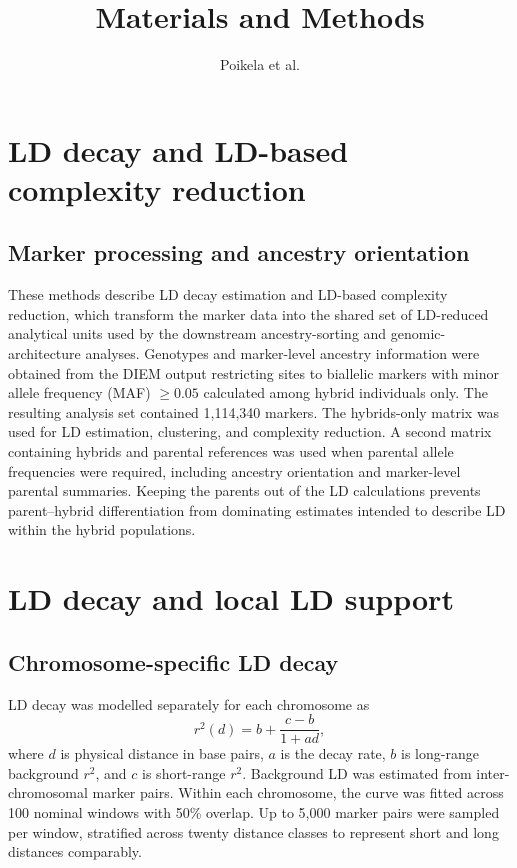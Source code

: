 \documentclass[11pt]{article}
\title{\vspace{-3em}
  \textbf{\color{Accent}Materials and Methods}\\[0.3em]}
\author{Poikela et al.}
\begin{document}
\maketitle
\section*{LD decay and LD-based complexity reduction}

\subsection*{Marker processing and ancestry orientation}

These methods describe LD decay estimation and LD-based complexity reduction,
which transform the marker data into the shared set of LD-reduced analytical units \citep{FangEtAl2021,li2018linkage-744} used by the downstream ancestry-sorting and genomic-architecture analyses. Genotypes and marker-level ancestry information were obtained from the DIEM output restricting sites to biallelic markers with minor allele frequency (MAF) \(\geq 0.05\)  calculated among hybrid individuals only. The resulting analysis set contained 1,114,340 markers. The hybrids-only matrix was used for LD estimation, clustering, and complexity reduction. A second matrix containing hybrids and parental references was used when parental allele frequencies were required, including ancestry orientation and marker-level parental summaries. Keeping the parents out of the LD calculations prevents parent--hybrid differentiation from dominating estimates intended to describe LD within the hybrid populations.

\section*{LD decay and local LD support}

\subsection*{Chromosome-specific LD decay}


LD decay was modelled separately for each chromosome as
\begin{equation}
  r^2(d) = b + \frac{c-b}{1+a d},
  \label{eq:lddecay}
\end{equation}
where \(d\) is physical distance in base pairs, \(a\) is the decay rate, \(b\) is long-range background \(r^2\), and \(c\) is short-range \(r^2\). Background LD was estimated from inter-chromosomal marker pairs. Within each chromosome, the curve was fitted across 100 nominal windows with 50\% overlap. Up to 5,000 marker pairs were sampled per window, stratified across twenty distance classes to represent short and long distances comparably.
\end{document}
